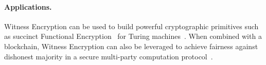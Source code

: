 \paragraph{Applications.}
Witness Encryption can be used to build powerful cryptographic primitives such as succinct Functional Encryption~\cite{functional_encryption} for Turing machines~\cite{turing_machine_fe}.
When combined with a blockchain, Witness Encryption can also be leveraged to achieve fairness against dishonest majority in a secure multi-party computation protocol~\cite{we_mpc_fairness}.